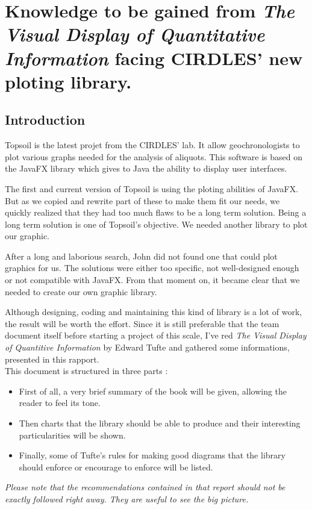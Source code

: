 \chapter{Knowledge to be gained from \textit{The Visual Display of Quantitative Information} facing CIRDLES' new ploting library.}

\section{Introduction}
Topsoil is the latest projet from the CIRDLES' lab. It allow geochronologists to plot various graphs needed for the analysis of aliquots. This software is based on the JavaFX library which gives to Java the ability to display user interfaces.

The first and current version of Topsoil is using the ploting abilities of JavaFX. But as we copied and rewrite part of these to make them fit our needs, we quickly realized that they had too much flaws to be a long term solution.
 Being a long term solution is one of Topsoil's objective. We needed another library to plot our graphic.

After a long and laborious search, John did not found one that could plot graphics for us. The solutions were either too specific, not well-designed enough or not compatible with JavaFX. From that moment on, it became clear that we needed to create our own graphic library. 

Although designing, coding and maintaining this kind of library is a lot of work, the result will be worth the effort.
 Since it is still preferable that the team document itself before starting a project of this scale,
 I've red \textit{The Visual Display of Quantitive Information} by Edward Tufte and gathered some informations, presented in this rapport.
\\

This document is structured in three parts : 
\begin{itemize}
\item First of all, a very brief summary of the book will be given, allowing the reader to feel its tone.
\item Then charts that the library should be able to produce and their interesting particularities will be shown.
\item Finally, some of Tufte's rules for making good diagrams that the library should enforce or encourage to enforce will be listed. 
\end{itemize}
\emph{Please note that the recommendations contained in that report should not be exactly followed right away. They are useful to see the big picture.}%




